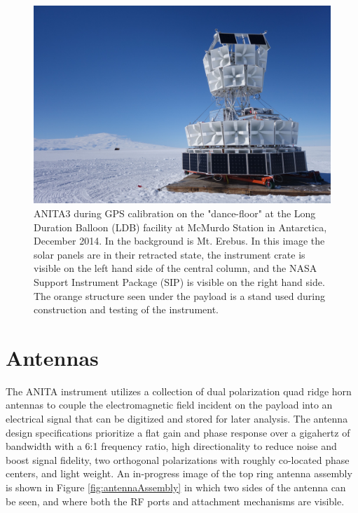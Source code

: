 \begin{figure}
\centering
	\includegraphics[width=\textwidth]{figures/ANITA3_dancefloor}
	\caption{ANITA3 during GPS calibration on the "dance-floor" at the Long Duration Balloon (LDB) facility at McMurdo Station in Antarctica, December 2014.  In the background is Mt. Erebus.  In this image the solar panels are in their retracted state, the instrument crate is visible on the left hand side of the central column, and the NASA Support Instrument Package (SIP) is visible on the right hand side. The orange structure seen under the payload is a stand used during construction and testing of the instrument.}
	\label{fig:ANITA3_dancefloor}
\end{figure}



	
\section{Antennas}
	The ANITA instrument utilizes a collection of dual polarization quad ridge horn antennas to couple the electromagnetic field incident on the payload into an electrical signal that can be digitized and stored for later analysis.  The antenna design specifications prioritize a flat gain and phase response over a gigahertz of bandwidth with a 6:1 frequency ratio, high directionality to reduce noise and boost signal fidelity, two orthogonal polarizations with roughly co-located phase centers, and light weight. 	An in-progress image of the top ring antenna assembly is shown in Figure \ref{fig:antennaAssembly} in which two sides of the antenna can be seen, and where both the RF ports and attachment mechanisms are visible.
	

